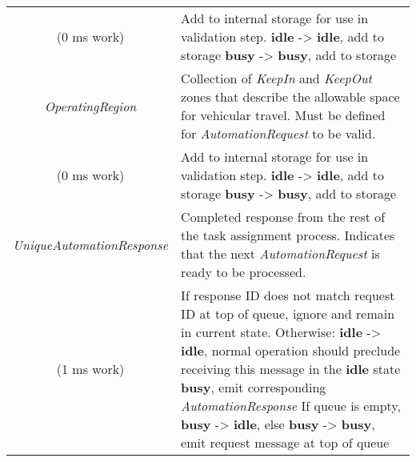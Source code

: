 \begin{longtable}[]{@{}cl@{}}
\begin{minipage}[t]{0.4\columnwidth}
(0 ms work)\strut
\end{minipage} & \begin{minipage}[t]{0.55\columnwidth}\raggedright\strut
Add to internal storage for use in validation step. \textbf{idle}
-\textgreater{} \textbf{idle}, add to storage \textbf{busy}
-\textgreater{} \textbf{busy}, add to storage\strut
\end{minipage}\tabularnewline
\begin{minipage}[t]{0.4\columnwidth}\centering\strut
\emph{OperatingRegion}\strut
\end{minipage} & \begin{minipage}[t]{0.55\columnwidth}\raggedright\strut
Collection of \emph{KeepIn} and \emph{KeepOut} zones that describe the
allowable space for vehicular travel. Must be defined for
\emph{AutomationRequest} to be valid.\strut
\end{minipage}\tabularnewline
\begin{minipage}[t]{0.4\columnwidth}\centering\strut
(0 ms work)\strut
\end{minipage} & \begin{minipage}[t]{0.55\columnwidth}\raggedright\strut
Add to internal storage for use in validation step. \textbf{idle}
-\textgreater{} \textbf{idle}, add to storage \textbf{busy}
-\textgreater{} \textbf{busy}, add to storage\strut
\end{minipage}\tabularnewline
\begin{minipage}[t]{0.4\columnwidth}\centering\strut
\emph{UniqueAutomationResponse}\strut
\end{minipage} & \begin{minipage}[t]{0.55\columnwidth}\raggedright\strut
Completed response from the rest of the task assignment process.
Indicates that the next \emph{AutomationRequest} is ready to be
processed.\strut
\end{minipage}\tabularnewline
\begin{minipage}[t]{0.4\columnwidth}\centering\strut
(1 ms work)\strut
\end{minipage} & \begin{minipage}[t]{0.55\columnwidth}\raggedright\strut
If response ID does not match request ID at top of queue, ignore and
remain in current state. Otherwise: \textbf{idle} -\textgreater{}
\textbf{idle}, normal operation should preclude receiving this message
in the \textbf{idle} state \textbf{busy}, emit corresponding
\emph{AutomationResponse} If queue is empty, \textbf{busy}
-\textgreater{} \textbf{idle}, else \textbf{busy} -\textgreater{}
\textbf{busy}, emit request message at top of queue\strut
\end{minipage}\tabularnewline
\bottomrule
\end{longtable}

